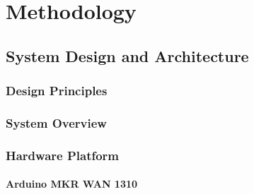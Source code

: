\documentclass[12pt, a4paper, twoside, openright]{report}
\begin{document}


\chapter{Methodology}
\label{ch:methodology}
\label{sec:methodology}

\section{System Design and Architecture}
\label{sec:system-design}

\subsection{Design Principles}

\subsection{System Overview}

\subsection{Hardware Platform}

\subsubsection{Arduino MKR WAN 1310}
\end{document}
